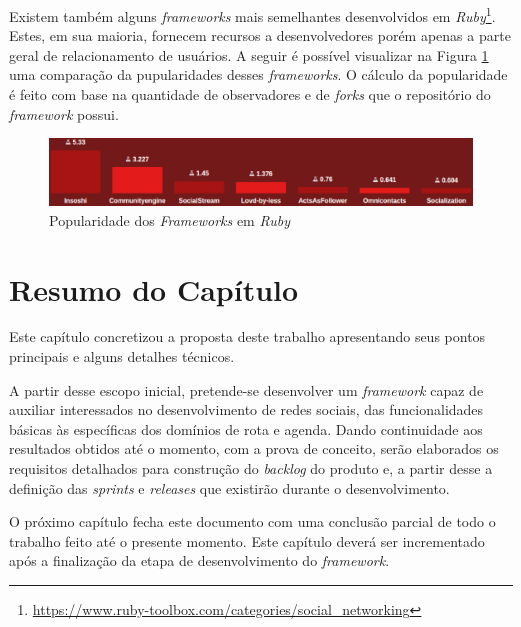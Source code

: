 Existem também alguns \textit{frameworks} mais semelhantes desenvolvidos em \textit{Ruby}\footnote{\url{https://www.ruby-toolbox.com/categories/social_networking}}. Estes, em sua maioria, fornecem recursos a desenvolvedores porém apenas a parte geral de relacionamento de usuários. A seguir é possível visualizar na Figura \ref{ruby_social_network} uma comparação da pupularidades desses \textit{frameworks}. O cálculo da popularidade é feito com base na quantidade de observadores e de \textit{forks} que o repositório do \textit{framework} possui.

\begin{figure}[!h]
	\centering
	\includegraphics[scale=0.45]{figuras/capitulo5/ruby_social_network.eps}
	\caption{Popularidade dos \textit{Frameworks} em \textit{Ruby}}
	\label{ruby_social_network}
\end{figure}

\section{Resumo do Capítulo}

Este capítulo concretizou a proposta deste trabalho apresentando seus pontos principais e alguns detalhes técnicos.

A partir desse escopo inicial, pretende-se desenvolver um \textit{framework}  capaz de auxiliar interessados no desenvolvimento de redes sociais, das funcionalidades básicas às específicas dos domínios de rota e agenda. Dando continuidade aos resultados obtidos até o momento, com a prova de conceito, serão elaborados os requisitos detalhados para construção do \textit{backlog} do produto e, a partir desse a definição das \textit{sprints} e \textit{releases} que existirão durante o desenvolvimento.

O próximo capítulo fecha este documento com uma conclusão parcial de todo o trabalho feito até o presente momento. Este capítulo deverá ser incrementado após a finalização da etapa de desenvolvimento do \textit{framework}.
